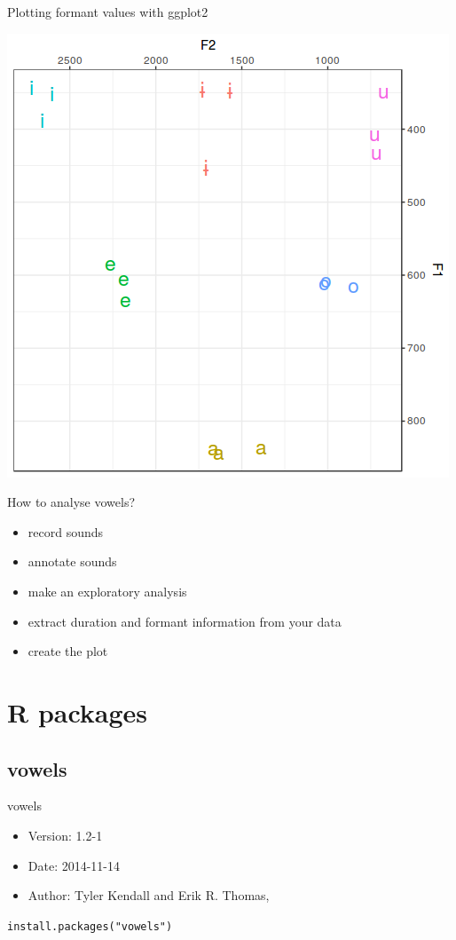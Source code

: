 \begin{frame}[fragile]{Plotting formant values with ggplot2}
\begin{center}
\includegraphics[width=0.7\linewidth]{06-ggplot.png}
\end{center}
\end{frame}

\begin{frame}{How to analyse vowels?}
\begin{itemize}
\item[\checkmark] record sounds
\item[\checkmark] annotate sounds
\item[\checkmark] make an exploratory analysis
\item[\checkmark] extract duration and formant information from your data
\item[\checkmark] create the plot
\end{itemize}
\end{frame}

\section{R packages}
\subsection{vowels}
\begin{frame}{vowels}
\begin{itemize}
\item Version: 1.2-1
\item Date: 2014-11-14
\item Author: Tyler Kendall and Erik R. Thomas, \citep{kendall14}
\end{itemize}
\vfill
\texttt{install.packages("vowels")}
\end{frame}


